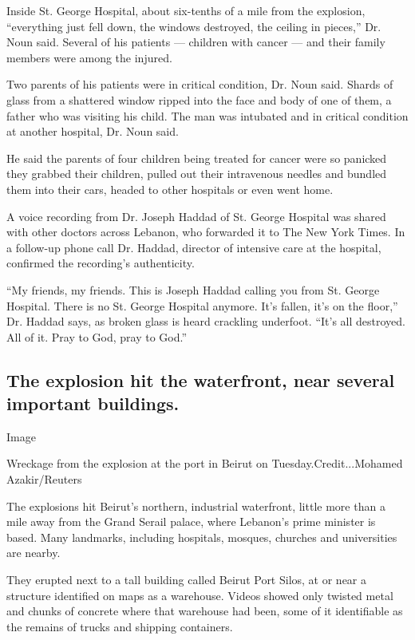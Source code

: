 Inside St. George Hospital, about six-tenths of a mile from the
explosion, ``everything just fell down, the windows destroyed, the
ceiling in pieces,'' Dr. Noun said. Several of his patients --- children
with cancer --- and their family members were among the injured.

Two parents of his patients were in critical condition, Dr. Noun said.
Shards of glass from a shattered window ripped into the face and body of
one of them, a father who was visiting his child. The man was intubated
and in critical condition at another hospital, Dr. Noun said.

He said the parents of four children being treated for cancer were so
panicked they grabbed their children, pulled out their intravenous
needles and bundled them into their cars, headed to other hospitals or
even went home.

A voice recording from Dr. Joseph Haddad of St. George Hospital was
shared with other doctors across Lebanon, who forwarded it to The New
York Times. In a follow-up phone call Dr. Haddad, director of intensive
care at the hospital, confirmed the recording's authenticity.

``My friends, my friends. This is Joseph Haddad calling you from St.
George Hospital. There is no St. George Hospital anymore. It's fallen,
it's on the floor,'' Dr. Haddad says, as broken glass is heard crackling
underfoot. ``It's all destroyed. All of it. Pray to God, pray to God.''

\hypertarget{the-explosion-hit-the-waterfront-near-several-important-buildings}{%
\subsection{The explosion hit the waterfront, near several important
buildings.}\label{the-explosion-hit-the-waterfront-near-several-important-buildings}}

Image

Wreckage from the explosion at the port in Beirut on
Tuesday.Credit...Mohamed Azakir/Reuters

The explosions hit Beirut's northern, industrial waterfront, little more
than a mile away from the Grand Serail palace, where Lebanon's prime
minister is based. Many landmarks, including hospitals, mosques,
churches and universities are nearby.

They erupted next to a tall building called Beirut Port Silos, at or
near a structure identified on maps as a warehouse. Videos showed only
twisted metal and chunks of concrete where that warehouse had been, some
of it identifiable as the remains of trucks and shipping containers.

